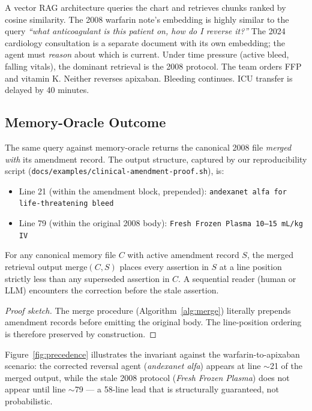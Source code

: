 \documentclass[runningheads]{llncs}
\begin{document}
A vector RAG architecture queries the chart and retrieves chunks ranked by
cosine similarity. The 2008 warfarin note's embedding is highly similar to
the query \emph{``what anticoagulant is this patient on, how do I reverse
it?''} The 2024 cardiology consultation is a separate document with its own
embedding; the agent must \emph{reason} about which is current. Under time
pressure (active bleed, falling vitals), the dominant retrieval is the 2008
protocol. The team orders FFP and vitamin K. Neither reverses apixaban.
Bleeding continues. ICU transfer is delayed by 40 minutes.

\subsection{Memory-Oracle Outcome}

The same query against memory-oracle returns the canonical 2008 file
\emph{merged with} its amendment record. The output structure, captured
by our reproducibility script
(\texttt{docs/examples/clinical-amendment-proof.sh}), is:

\begin{itemize}
  \item Line 21 (within the amendment block, prepended):
        \texttt{andexanet alfa for life-threatening bleed}
  \item Line 79 (within the original 2008 body):
        \texttt{Fresh Frozen Plasma 10--15 mL/kg IV}
\end{itemize}

\begin{theorem}
\label{thm:precedence}
For any canonical memory file $C$ with active amendment record $S$, the
merged retrieval output $\mathrm{merge}(C, S)$ places every assertion in $S$
at a line position strictly less than any superseded assertion in $C$. A
sequential reader (human or LLM) encounters the correction before the stale
assertion.
\end{theorem}

\begin{proof}[Proof sketch]
The merge procedure (Algorithm~\ref{alg:merge}) literally prepends
amendment records before emitting the original body. The line-position
ordering is therefore preserved by construction.
\end{proof}

Figure~\ref{fig:precedence} illustrates the invariant against the
warfarin-to-apixaban scenario: the corrected reversal agent (\emph{andexanet
alfa}) appears at line $\sim$21 of the merged output, while the stale
2008 protocol (\emph{Fresh Frozen Plasma}) does not appear until line
$\sim$79 --- a 58-line lead that is structurally guaranteed, not
probabilistic.
\end{document}
